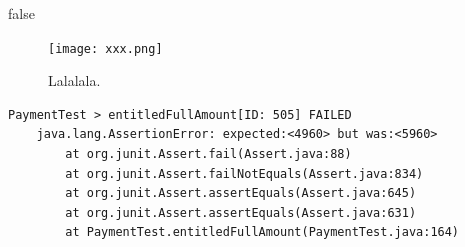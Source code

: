 \documentclass[12pt,a4paper]{report}
\begin{document}
\if false

\begin{figure}[H]
    \centering
    \texttt{[image: xxx.png]}
    \caption{Lalalala.}
    \label{fig:my_label}
\end{figure}

\begin{verbatim}
PaymentTest > entitledFullAmount[ID: 505] FAILED
    java.lang.AssertionError: expected:<4960> but was:<5960>
        at org.junit.Assert.fail(Assert.java:88)
        at org.junit.Assert.failNotEquals(Assert.java:834)
        at org.junit.Assert.assertEquals(Assert.java:645)
        at org.junit.Assert.assertEquals(Assert.java:631)
        at PaymentTest.entitledFullAmount(PaymentTest.java:164)
\end{verbatim}
\end{document}
